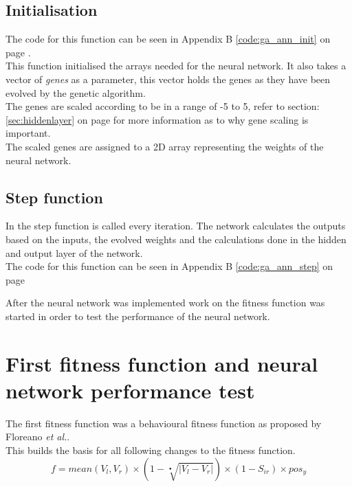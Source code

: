 \subsection{Initialisation}
\label{chap3:ga_ann_init}
The code for this function can be seen in Appendix B \ref{code:ga_ann_init} on page \pageref{code:ga_ann_init}.\\
This function initialised the arrays needed for the neural network.
It also takes a vector of \textit{genes} as a parameter, this vector holds the genes as they have been evolved by the genetic algorithm.\\
The genes are scaled according to be in a range of -5 to 5, refer to section: \ref{sec:hiddenlayer} on page \pageref{sec:hiddenlayer} for more information as to why gene scaling is important.\\
The scaled genes are assigned to a 2D array representing the weights of the neural network. \\

\subsection{Step function}
\label{chap3:ga_ann_step}
In the step function is called every iteration. The network calculates the outputs based on the inputs, the evolved weights and the calculations done in the hidden and output layer of the network.\\
The code for this function can be seen in Appendix B \ref{code:ga_ann_step} on page \pageref{code:ga_ann_step}

After the neural network was implemented work on the fitness function was started in order to test the performance of the neural network. 

\section{First fitness function and neural network performance test}
The first fitness function was a behavioural fitness function as proposed by Floreano \textit{et al.}\cite{499791}.\\
This builds the basis for all following changes to the fitness function. \\

\begin{equation}\label{chap3eq:base_fittness}
f = mean(V_l, V_r) \times ( 1 - \sqrt[•]{|V_l - V_r|}) \times (1 - S_{ir}) \times pos_y
\end{equation}

